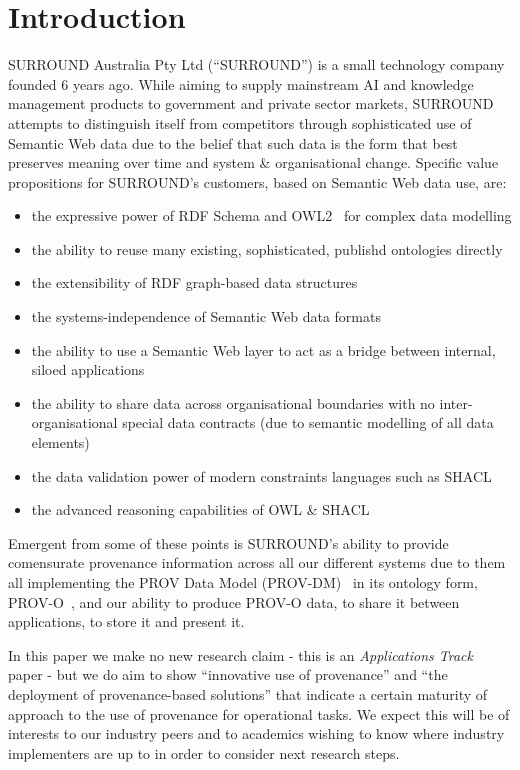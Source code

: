 \documentclass[letterpaper,twocolumn,10pt]{article}
\begin{document}
\section{Introduction}
SURROUND Australia Pty Ltd (``SURROUND'') is a small technology company founded 6 years ago. While
aiming to supply mainstream AI and knowledge management products to government and private
sector markets, SURROUND attempts to distinguish itself from competitors through sophisticated use
of Semantic Web data due to the belief that such data is the form that best preserves meaning 
over time and system \& organisational change. Specific value propositions for SURROUND's customers, 
based on Semantic Web data use, are:

\begin{itemize}
  \item the expressive power of RDF Schema and OWL2~\cite{dan_brickley_rdf_2014,w3c_owl_working_group_owl_2012} for complex data modelling
  \item the ability to reuse many existing, sophisticated, publishd ontologies directly
  \item the extensibility of RDF graph-based data structures
  \item the systems-independence of Semantic Web data formats
  \item the ability to use a Semantic Web layer to act as a bridge between internal, siloed applications
  \item the ability to share data across organisational boundaries with no inter-organisational special data contracts (due to semantic modelling of all data elements)
  \item the data validation power of modern constraints languages such as SHACL~\cite{knublauch_shapes_2017}
  \item the advanced reasoning capabilities of OWL \& SHACL
\end{itemize}

Emergent from some of these points is SURROUND's ability to provide comensurate provenance information 
across all our different systems due to them all implementing the PROV Data Model (PROV-DM)~\cite{moreau_prov-dm_2013}
in its ontology form, PROV-O~\cite{lebo_prov-o:_2013}, and our ability to produce PROV-O data, to share 
it between applications, to store it and present it.

In this paper we make no new research claim - this is an \textit{Applications Track} paper - but we do aim 
to show ``innovative use of provenance'' and ``the deployment of provenance-based solutions'' that indicate
a certain maturity of approach to the use of provenance for operational tasks. We expect this will be of 
interests to our industry peers and to academics wishing to know where industry implementers are up to
in order to consider next research steps.
\end{document}
